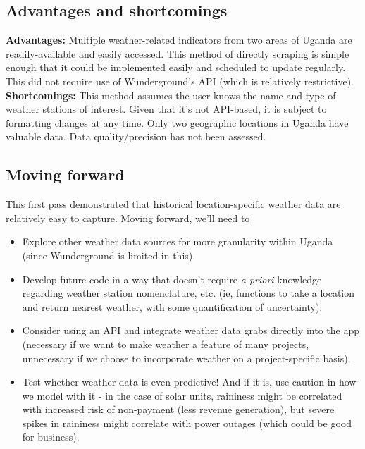 \documentclass[11pt]{article}
\begin{document}
\begin{multicols}{2}
\subsection*{Advantages and shortcomings}
\noindent \textbf{Advantages:} Multiple weather-related indicators from two areas of Uganda are readily-available and easily accessed.  This method of directly scraping is simple enough that it could be implemented easily and scheduled to update regularly.  This did not require use of Wunderground's API (which is relatively restrictive).  \\

\noindent \textbf{Shortcomings:} This method assumes the user knows the name and type of weather stations of interest. Given that it's not API-based, it is subject to formatting changes at any time.  Only two geographic locations in Uganda have valuable data.  Data quality/precision has not been assessed.

\subsection*{Moving forward}
This first pass demonstrated that historical location-specific weather data are relatively easy to capture.  Moving forward, we'll need to \begin{itemize}
\item Explore other weather data sources for more granularity within Uganda (since Wunderground is limited in this).
\item Develop future code in a way that doesn't require \emph{a priori} knowledge regarding weather station nomenclature, etc. (ie, functions to take a location and return nearest weather, with some quantification of uncertainty).
\item Consider using an API and integrate weather data grabs directly into the app (necessary if we want to make weather a feature of many projects, unnecessary if we choose to incorporate weather on a project-specific basis).
\item Test whether weather data is even predictive! And if it is, use caution in how we model with it - in the case of solar units, raininess might be correlated with increased risk of non-payment (less revenue generation), but severe spikes in raininess might correlate with power outages (which could be good for business).  
\end{itemize}


\end{multicols}
\end{document}
